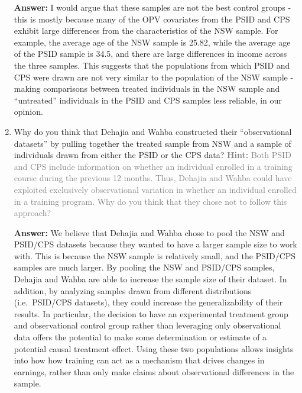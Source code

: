 \documentclass[
]{article}
\begin{document}
\begin{enumerate}
  \textbf{Answer:} I would argue that these samples are not the best
  control groups - this is mostly because many of the OPV covariates
  from the PSID and CPS exhibit large differences from the
  characteristics of the NSW sample. For example, the average age of the
  NSW sample is 25.82, while the average age of the PSID sample is 34.5,
  and there are large differences in income across the three samples.
  This suggests that the populations from which PSID and CPS were drawn
  are not very similar to the population of the NSW sample - making
  comparisons between treated individuals in the NSW sample and
  ``untreated'' individuals in the PSID and CPS samples less reliable,
  in our opinion.
\item
  Why do you think that Dehajia and Wahba constructed their
  ``observational datasets'' by pulling together the treated sample from
  NSW and a sample of individuals drawn from either the PSID or the CPS
  data?
  \textcolor{gray}{\textbf{Hint:} Both PSID and CPS include information on whether an individual enrolled in a training course during the previous 12 months. Thus, Dehajia and Wahba could have exploited exclusively observational variation in whether an individual enrolled in a training program. Why do you think that they chose not to follow this approach?}

  \textbf{Answer:} We believe that Dehajia and Wahba chose to pool the
  NSW and PSID/CPS datasets because they wanted to have a larger sample
  size to work with. This is because the NSW sample is relatively small,
  and the PSID/CPS samples are much larger. By pooling the NSW and
  PSID/CPS samples, Dehajia and Wahba are able to increase the sample
  size of their dataset. In addition, by analyzing samples drawn from
  different distributions (i.e.~PSID/CPS datasets), they could increase
  the generalizability of their results. In particular, the decision to
  have an experimental treatment group and observational control group
  rather than leveraging only observational data offers the potential to
  make some determination or estimate of a potential causal treatment
  effect. Using these two populations allows insights into how how
  training can act as a mechanism that drives changes in earnings,
  rather than only make claims about observational differences in the
  sample.
\end{enumerate}


\end{document}
